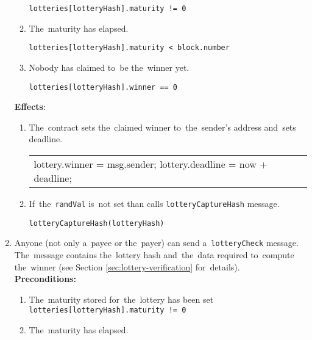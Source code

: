 \documentclass[a4paper]{article}
\begin{document}
\begin{enumerate}
\begin{enumerate}
\begin{center}
                        \texttt{lotteries[lotteryHash].maturity != 0}
                    \end{center}
                \item The~maturity has elapsed.
                    \begin{center}
		                \texttt{lotteries[lotteryHash].maturity < block.number}
		            \end{center}
                \item Nobody has claimed to~be the~winner yet.
                    \begin{center}
                        \texttt{lotteries[lotteryHash].winner == 0}
                    \end{center}
            \end{enumerate}
            \textbf{Effects}:
            \begin{enumerate}
                \item The~contract sets the~claimed winner to~the~sender's address and~sets deadline.
                    \begin{center}
                        \begin{tabular}{l}
                		    lottery.winner = msg.sender;
                            lottery.deadline = now + deadline;
                        \end{tabular}
                    \end{center}
                \item If~the~\texttt{randVal} is~not set than calls \texttt{lotteryCaptureHash} message.
                    \begin{center}
                        \texttt{lotteryCaptureHash(lotteryHash)}
                    \end{center}
            \end{enumerate}
        \item Anyone (not only a~payee or the~payer) can send a~\texttt{lotteryCheck} message. The~message contains
            the~lottery hash and~the~data required to~compute the~winner (see Section \ref{sec:lottery-verification}
            for~details).\\
            \textbf{Preconditions:}
            \begin{enumerate}
                \item The~maturity stored for~the~lottery has been set
                    \texttt{lotteries[lotteryHash].maturity != 0}
                \item The~maturity has elapsed.

\end{enumerate}
\end{enumerate}
\end{document}
